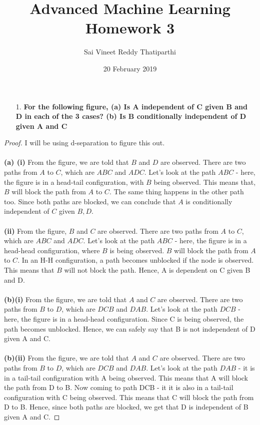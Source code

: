 \documentclass{article}
\date{20 February 2019}
\theoremstyle{case}
\begin{document}
\author{Sai Vineet Reddy Thatiparthi}

 \title{%
  Advanced Machine Learning \\
  \large Homework 3}
\maketitle
\begin{enumerate}
    \item [1.] \textbf{For the following figure, (a) Is A independent of C given B and D in each
of the 3 cases? (b) Is B conditionally independent of D given A and C}
\end{enumerate} 
\begin{proof} 
I will be using d-separation to figure this out.\\ \\
\textbf{(a) (i)} From the figure, we are told that $B$ and $D$ are observed. There are two paths from $A$ to $C$, which are $ABC$ and $ADC$. Let's look at the path $ABC$ - here, the figure is in a head-tail configuration, with $B$ being observed. This means that, $B$ will block the path from $A$ to $C$. The same thing happens in the other path too. Since both paths are blocked, we can conclude that $A$ is conditionally independent of $C$ given $B, D$.\\ \\
\textbf{(ii)} From the figure, $B$ and $C$ are observed. There are two paths from $A$ to $C$, which are $ABC$ and $ADC$. Let's look at the path $ABC$ - here, the figure is in a head-head configuration, where $B$ is being observed. $B$ will block the path from $A$ to $C$. In an H-H configuration, a path becomes unblocked if the node is observed. This means that $B$ will not block the path. Hence, A is dependent on C given B and D.\\ \\
\textbf{(b)(i)} From the figure, we are told that $A$ and $C$ are observed. There are two paths from $B$ to $D$, which are $DCB$ and $DAB$. Let's look at the path $DCB$ - here, the figure is in a head-head configuration. Since C is being observed, the path becomes unblocked. Hence, we can safely say that B is not independent of D given A and C. \\ \\
\textbf{(b)(ii)} From the figure, we are told that $A$ and $C$ are observed. There are two paths from $B$ to $D$, which are $DCB$ and $DAB$. Let's look at the path $DAB$ - it is in a tail-tail configuration with A being observed. This means that A will block the path from D to B. Now coming to path DCB - it it is also in a tail-tail configuration with C being observed. This means that C will block the path from D to B. Hence, since both paths are blocked, we get that D is independent of B given A and C.
\end{proof}
\end{document}
